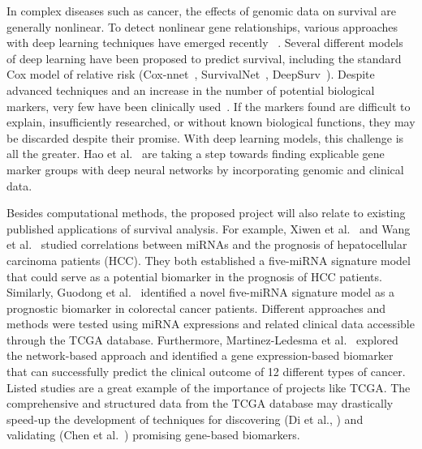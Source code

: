 \documentclass[11pt,a4paper]{article}
\begin{document}
In complex diseases such as cancer, the effects of genomic data on survival are generally nonlinear. To detect nonlinear gene relationships, various approaches with deep learning techniques have emerged recently ~\cite{hao2019interpretable}. Several different models of deep learning have been proposed to predict survival, including the standard Cox model of relative risk (Cox-nnet~\cite{ching2018cox}, SurvivalNet~\cite {yousefi2017predicting}, DeepSurv~\cite{katzman2018deepsurv}). Despite advanced techniques and an increase in the number of potential biological markers, very few have been clinically used~\cite{burke2016predicting}. If the markers found are difficult to explain, insufficiently researched, or without known biological functions, they may be discarded despite their promise. With deep learning models, this challenge is all the greater. Hao et al.~\cite{hao2019interpretable} are taking a step towards finding explicable gene marker groups with deep neural networks by incorporating genomic and clinical data.


Besides computational methods, the proposed project will also relate to existing published applications of survival analysis. For example, Xiwen et al.~\cite{liao2018identification} and Wang et al.~\cite{33313167} studied correlations between miRNAs and the prognosis of hepatocellular carcinoma patients (HCC). They both established a five-miRNA signature model that could serve as a potential biomarker in the prognosis of HCC patients. Similarly, Guodong et al.~\cite{31799184} identified a novel five-miRNA signature model as a prognostic biomarker in colorectal cancer patients. Different approaches and methods were tested using miRNA expressions and related clinical data accessible through the TCGA database. Furthermore, Martinez-Ledesma et al.~\cite{26202601} explored the network-based approach and identified a gene expression-based biomarker that can successfully predict the clinical outcome of 12 different types of cancer. Listed studies are a great example of the importance of projects like TCGA. The comprehensive and structured data from the TCGA database may drastically speed-up the development of techniques for discovering (Di et al., \cite{29676997}) and validating (Chen et al.~\cite{32289666}) promising gene-based biomarkers.


\end{document}

